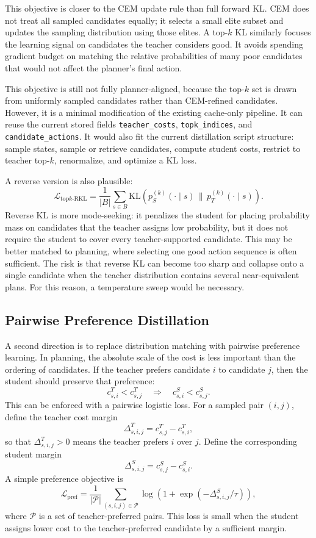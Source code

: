 \documentclass[11pt]{article}
\begin{document}
This objective is closer to the CEM update rule than full forward KL. CEM does not treat all sampled candidates equally; it selects a small elite subset and updates the sampling distribution using those elites. A top-\(k\) KL similarly focuses the learning signal on candidates the teacher considers good. It avoids spending gradient budget on matching the relative probabilities of many poor candidates that would not affect the planner's final action.

This objective is still not fully planner-aligned, because the top-\(k\) set is drawn from uniformly sampled candidates rather than CEM-refined candidates. However, it is a minimal modification of the existing cache-only pipeline. It can reuse the current stored fields \texttt{teacher\_costs}, \texttt{topk\_indices}, and \texttt{candidate\_actions}. It would also fit the current distillation script structure: sample states, sample or retrieve candidates, compute student costs, restrict to teacher top-\(k\), renormalize, and optimize a KL loss.

A reverse version is also plausible:
\[
    \mathcal{L}_{\mathrm{top}k\text{-}\mathrm{RKL}}
    =
    \frac{1}{|B|}
    \sum_{s \in B}
    \mathrm{KL}
    \left(
        p_S^{(k)}(\cdot \mid s)
        \,\|\,
        p_T^{(k)}(\cdot \mid s)
    \right).
\]
Reverse KL is more mode-seeking: it penalizes the student for placing probability mass on candidates that the teacher assigns low probability, but it does not require the student to cover every teacher-supported candidate. This may be better matched to planning, where selecting one good action sequence is often sufficient. The risk is that reverse KL can become too sharp and collapse onto a single candidate when the teacher distribution contains several near-equivalent plans. For this reason, a temperature sweep would be necessary.

\subsection{Pairwise Preference Distillation}
\label{sec:pairwise_preference_distillation}

A second direction is to replace distribution matching with pairwise preference learning. In planning, the absolute scale of the cost is less important than the ordering of candidates. If the teacher prefers candidate \(i\) to candidate \(j\), then the student should preserve that preference:
\[
    c^T_{s,i} < c^T_{s,j}
    \quad \Longrightarrow \quad
    c^S_{s,i} < c^S_{s,j}.
\]
This can be enforced with a pairwise logistic loss. For a sampled pair \((i,j)\), define the teacher cost margin
\[
    \Delta^T_{s,i,j}
    =
    c^T_{s,j} - c^T_{s,i},
\]
so that \(\Delta^T_{s,i,j} > 0\) means the teacher prefers \(i\) over \(j\). Define the corresponding student margin
\[
    \Delta^S_{s,i,j}
    =
    c^S_{s,j} - c^S_{s,i}.
\]
A simple preference objective is
\[
    \mathcal{L}_{\mathrm{pref}}
    =
    \frac{1}{|\mathcal{P}|}
    \sum_{(s,i,j)\in\mathcal{P}}
    \log
    \left(
        1 + \exp\left(-\Delta^S_{s,i,j}/\tau\right)
    \right),
\]
where \(\mathcal{P}\) is a set of teacher-preferred pairs. This loss is small when the student assigns lower cost to the teacher-preferred candidate by a sufficient margin.
\end{document}
